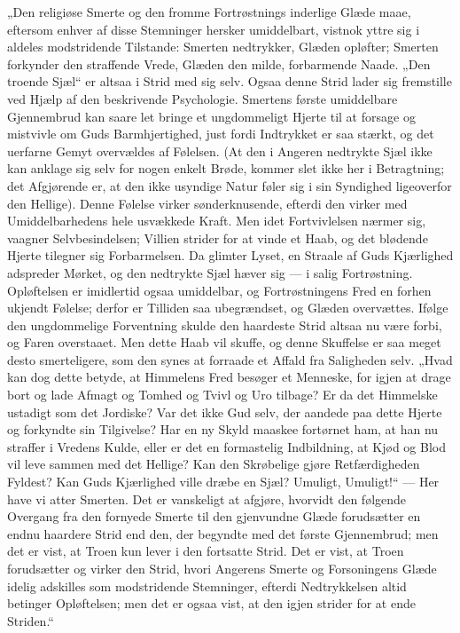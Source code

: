 \documentclass[12pt,a4paper]{book}
\begin{document}
„Den religiøse Smerte og den fromme Fortrøstnings inderlige Glæde maae, eftersom
enhver af disse Stemninger hersker umiddelbart, vistnok yttre sig i aldeles
modstridende Tilstande: Smerten nedtrykker, Glæden opløfter; Smerten forkynder
den straffende Vrede, Glæden den milde, forbarmende Naade. „Den troende Sjæl“ er
altsaa i Strid med sig selv. Ogsaa denne Strid lader sig fremstille ved Hjælp af
den beskrivende Psychologie. Smertens første umiddelbare Gjennembrud kan saare
let bringe et ungdommeligt Hjerte til at forsage og mistvivle om Guds
Barmhjertighed, just fordi Indtrykket er saa stærkt, og det uerfarne Gemyt
overvældes af Følelsen. (At den i Angeren nedtrykte Sjæl ikke kan anklage sig
selv for nogen enkelt Brøde, kommer slet ikke her i Betragtning; det Afgjørende
er, at den ikke usyndige Natur føler sig i sin Syndighed ligeoverfor den
Hellige). Denne Følelse virker sønderknusende, efterdi den virker med
Umiddelbarhedens hele usvækkede Kraft. Men idet Fortvivlelsen nærmer sig,
vaagner Selvbesindelsen; Villien strider for at vinde et Haab, og det blødende
Hjerte tilegner sig Forbarmelsen. Da glimter Lyset, en Straale af Guds
Kjærlighed adspreder Mørket, og den nedtrykte Sjæl hæver sig --- i salig
Fortrøstning. Opløftelsen er imidlertid ogsaa umiddelbar, og Fortrøstningens
Fred en forhen ukjendt Følelse; derfor er Tilliden saa ubegrændset, og Glæden
overvættes. Ifølge den ungdommelige Forventning skulde den haardeste Strid altsaa
nu være forbi, og Faren overstaaet. Men dette Haab vil skuffe, og denne
Skuffelse er saa meget desto smerteligere, som den synes at forraade et Affald
fra Saligheden selv. „Hvad kan dog dette betyde, at Himmelens Fred besøger et
Menneske, for igjen at drage bort og lade Afmagt og Tomhed og Tvivl og Uro
tilbage?
Er da det Himmelske ustadigt som det Jordiske? Var det ikke Gud selv, der
aandede paa dette Hjerte og forkyndte sin Tilgivelse? Har en ny Skyld maaskee
fortørnet ham, at han nu straffer i Vredens Kulde, eller er det en formastelig
Indbildning, at Kjød og Blod vil leve sammen med det Hellige? Kan den Skrøbelige
gjøre Retfærdigheden Fyldest? Kan Guds Kjærlighed ville dræbe en Sjæl? Umuligt,
Umuligt!“ --- Her have vi atter Smerten. Det er vanskeligt at afgjøre, hvorvidt
den følgende Overgang fra den fornyede Smerte til den gjenvundne Glæde
forudsætter en endnu haardere Strid end den, der begyndte med det første
Gjennembrud; men det er vist, at Troen kun lever i den fortsatte Strid. Det er
vist, at Troen forudsætter og virker den Strid, hvori Angerens Smerte og
Forsoningens Glæde idelig adskilles som modstridende Stemninger, efterdi
Nedtrykkelsen altid betinger Opløftelsen; men det er ogsaa vist, at den igjen
strider for at ende Striden.“
\end{document}
